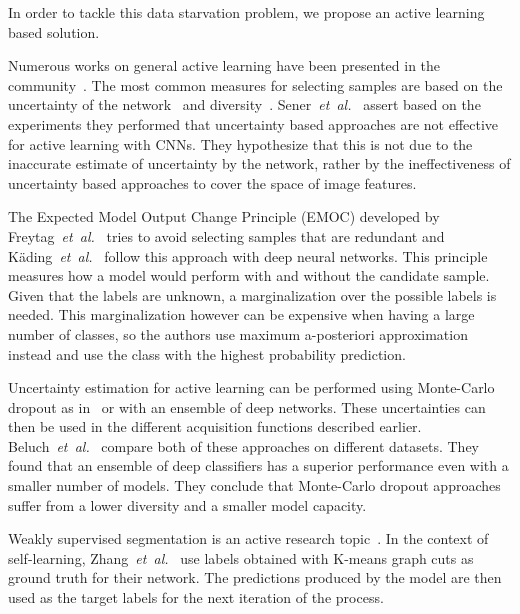 \documentclass[letterpaper, 10 pt, conference]{ieeeconf}  %
\newcommand\etal{\emph{et~al.}}
\begin{document}
In order to tackle this data starvation problem, we propose an active learning based solution.

Numerous works on general active learning have been presented in the community~\cite{settles2009active,guyon2011results,holub2008entropy, yoo2019learning}. The most common measures for selecting samples are based on the uncertainty of the network~\cite{zhou2017fine, yang2017suggestive, gal2017deep, wang2017cost} and diversity~\cite{zhou2017fine, dutt2016active, kading2016active}.  Sener~\etal~\cite{sener2017geometric} assert based on the experiments they performed that uncertainty based approaches are not effective for active learning with CNNs. They hypothesize that this is not due to the inaccurate estimate of uncertainty by the network, rather by the ineffectiveness of uncertainty based approaches to cover the space of image features.

The Expected Model Output Change Principle (EMOC) developed by Freytag~\etal~\cite{freytag2014selecting} tries to avoid selecting samples that are redundant and K{\"a}ding~\etal~\cite{kading2016active} follow this approach with deep neural networks. This principle measures how a model would perform with and without the candidate sample. Given that the labels are unknown, a marginalization over the possible labels is needed. This marginalization however can be expensive when having a large number of classes, so the authors use maximum a-posteriori approximation instead and use the class with the highest probability prediction.

Uncertainty estimation for active learning can be performed using Monte-Carlo dropout as in~\cite{gal2017deep} or with an ensemble of deep networks. These uncertainties can then be used in the different acquisition functions described earlier. Beluch~\etal~\cite{beluch2018power} compare both of these approaches on different datasets. They found that an ensemble of deep classifiers has a superior performance even with a smaller number of models. They conclude that Monte-Carlo dropout approaches suffer from a lower diversity and a smaller model capacity.

Weakly supervised segmentation is an active research topic~\cite{wei2018revisiting, acuna2018efficient, tang2018normalized, kwak2017weakly}. In the context of self-learning, Zhang~\etal~\cite{zhang2018self} use labels obtained with K-means graph cuts as ground truth for their network. The predictions produced by the model are then used as the target labels for the next iteration of the process.  
\end{document}
